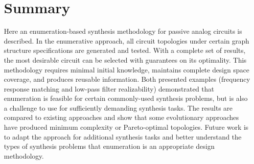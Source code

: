 \section{Summary\label{sec:ch6:conclusion}}

Here an enumeration-based synthesis methodology for passive analog circuits is described.
In the enumerative approach, all circuit topologies under certain graph structure specifications are generated and tested.
With a complete set of results, the most desirable circuit can be selected with guarantees on its optimality.
This methodology requires minimal initial knowledge, maintains complete design space coverage, and produces reusable information. 
Both presented examples (frequency response matching and low-pass filter realizability) demonstrated that enumeration is feasible for certain commonly-used synthesis problems, but is also a challenge to use for sufficiently demanding synthesis tasks.
The results are compared to existing approaches and show that some evolutionary approaches have produced minimum complexity or Pareto-optimal topologies.
Future work is to adapt the approach for additional synthesis tasks and better understand the types of synthesis problems that enumeration is an appropriate design methodology.